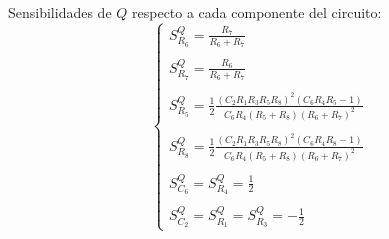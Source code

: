 Sensibilidades de $Q$ respecto a cada componente del circuito:
\begin{equation}
\begin{cases}
S^{Q}_{R_6} = \frac{R_{7}}{R_{6} + R_{7}}\\ \\
S^{Q}_{R_7} = \frac{R_{6}}{R_{6} + R_{7}}\\ \\
S^{Q}_{R_5} = \frac{1}{2} \frac{(C_{2} R_{1} R_{3} R_{5} R_{8})^2 \left(C_{6} R_{4} R_{5} - 1\right)}{C_{6} R_{4} \left(R_{5} + R_{8}\right) \left(R_{6} + R_{7}\right)^{2}} \\ \\
S^{Q}_{R_8} = \frac{1}{2} \frac{(C_{2} R_{1} R_{3} R_{5} R_{8})^2 \left(C_{6} R_{4} R_{8} - 1\right)}{C_{6} R_{4} \left(R_{5} + R_{8}\right) \left(R_{6} + R_{7}\right)^{2}} \\ \\
S^{Q}_{C_6} = S^{Q}_{R_4} =\frac{1}{2} \\ \\
S^{Q}_{C_2} = S^{Q}_{R_1} = S^{Q}_{R_3} =-\frac{1}{2}
\end{cases}
\end{equation}

